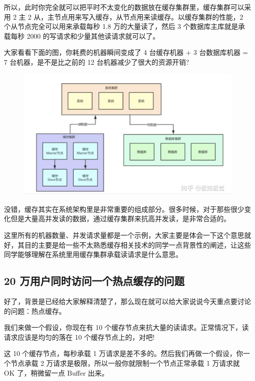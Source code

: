 \documentclass[12pt]{article}
\begin{document}
所以，此时你完全就可以把平时不太变化的数据放在缓存集群里，缓存集群可以采用 2 主 2 从，主节点用来写入缓存，从节点用来读缓存。以缓存集群的性能，2 个从节点完全可以用来承载每秒 1.8 万的大量读了，然后 3 个数据库主库就是承载每秒 2000 的写请求和少量其他读请求就可以了。

大家看看下面的图，你耗费的机器瞬间变成了 4 台缓存机器 + 3 台数据库机器 = 7 台机器，是不是比之前的 12 台机器减少了很大的资源开销?
\begin{figure}[H]
    \centering
    \includegraphics[width=.6\textwidth]{fig/Cache_Infrastructure_Hot_Key_3.png}
\end{figure}

没错，缓存其实在系统架构里是非常重要的组成部分。很多时候，对于那些很少变化但是大量高并发读的数据，通过缓存集群来抗高并发读，是非常合适的。

这里所有的机器数量、并发请求量都是一个示例，大家主要是体会一下这个意思就好，其目的主要是给一些不太熟悉缓存相关技术的同学一点背景性的阐述，让这些同学能够理解在系统里用缓存集群承载读请求是什么意思。

\subsection{20 万用户同时访问一个热点缓存的问题}
好了，背景是已经给大家解释清楚了，那么现在就可以给大家说说今天重点要讨论的问题：热点缓存。

我们来做一个假设，你现在有 10 个缓存节点来抗大量的读请求。正常情况下，读请求应该是均匀的落在 10 个缓存节点上的，对吧!

这 10 个缓存节点，每秒承载 1 万请求是差不多的。然后我们再做一个假设，你一个节点承载 2 万请求是极限，所以一般你就限制一个节点正常承载 1 万请求就 OK 了，稍微留一点 Buffer 出来。
\end{document}
